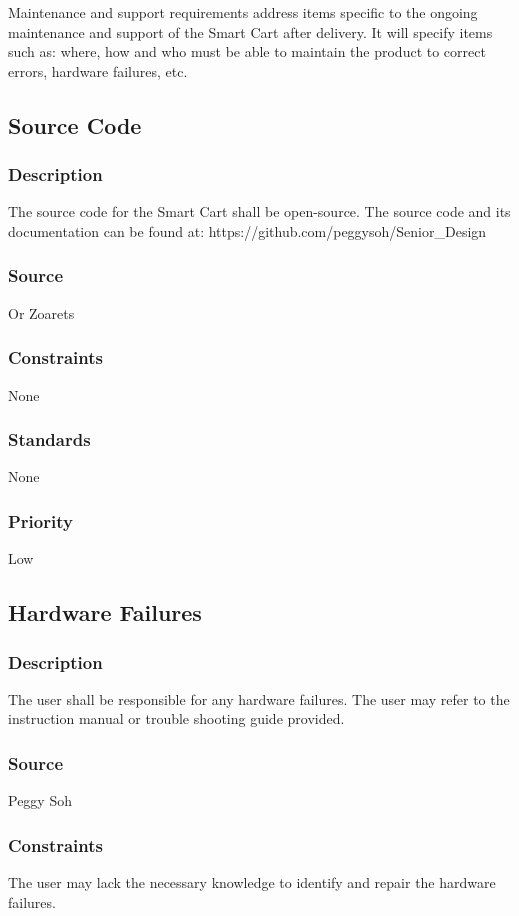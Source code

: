Maintenance and support requirements address items specific to the ongoing maintenance and support of the Smart Cart after delivery. It will specify items such as: where, how and who must be able to maintain the product to correct errors, hardware failures, etc.

\subsection{Source Code}
\subsubsection{Description}
The source code for the Smart Cart shall be open-source. The source code and its documentation can be found at: https://github.com/peggysoh/Senior_Design
\subsubsection{Source}
Or Zoarets
\subsubsection{Constraints}
None
\subsubsection{Standards}
None
\subsubsection{Priority}
Low


\subsection{Hardware Failures}
\subsubsection{Description}
The user shall be responsible for any hardware failures. The user may refer to the instruction manual or trouble shooting guide provided.
\subsubsection{Source}
Peggy Soh
\subsubsection{Constraints}
The user may lack the necessary knowledge to identify and repair the hardware failures.
